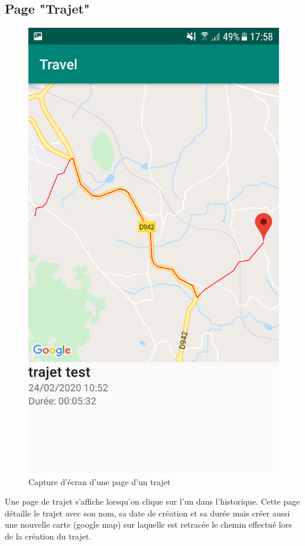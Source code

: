 \documentclass{article}
\begin{document}
\subsection{Page "Trajet"}
\begin{figure}
  \label{Trajet}
  \centering
  \includegraphics[scale=0.13]{images/travel.png}
  \caption{Capture d'écran d'une page d'un trajet}
\end{figure}
Une page de trajet s'affiche lorsqu'on clique sur l'un dans l'historique. Cette page détaille le trajet avec son nom, sa date de création et
sa durée mais créer aussi une nouvelle carte (google map) sur laquelle est retracée le chemin effectué lors de la création du trajet.
\end{document}
